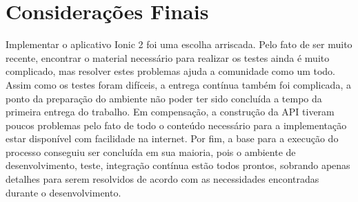 \section{Considerações Finais}
Implementar o aplicativo Ionic 2 foi uma escolha arriscada. Pelo fato de ser muito recente, encontrar o material necessário para realizar os testes ainda é muito complicado, mas resolver estes problemas ajuda a comunidade como um todo. Assim como os testes foram difíceis, a entrega contínua também foi complicada, a ponto da preparação do ambiente não poder ter sido concluída a tempo da primeira entrega do trabalho. Em compensação, a construção da API tiveram poucos problemas pelo fato de todo o conteúdo necessário para a implementação estar disponível com facilidade na internet. Por fim, a base para a execução do processo conseguiu ser concluída em sua maioria, pois o ambiente de desenvolvimento, teste, integração contínua estão todos prontos, sobrando apenas detalhes para serem resolvidos de acordo com as necessidades encontradas durante o desenvolvimento.
